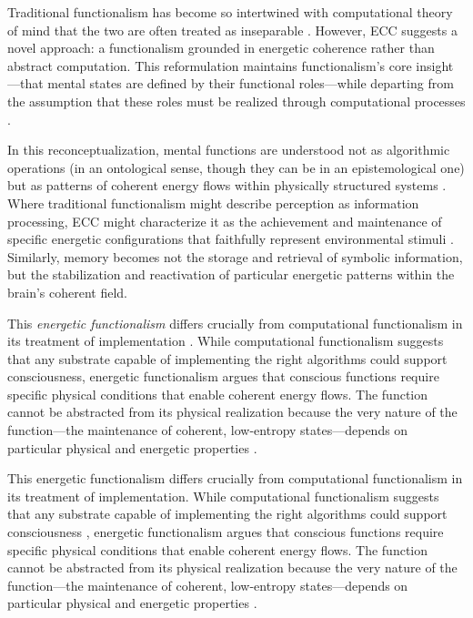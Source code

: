 \begin{refsection}
Traditional functionalism has become so intertwined with computational theory of mind that the two are often treated as inseparable \cite{piccinini2020neurocognitive}. However, ECC suggests a novel approach: a functionalism grounded in energetic coherence rather than abstract computation. This reformulation maintains functionalism's core insight—that mental states are defined by their functional roles—while departing from the assumption that these roles must be realized through computational processes \cite{van1995might}.

In this reconceptualization, mental functions are understood not as algorithmic operations (in an ontological sense, though they can be in an epistemological one) but as patterns of coherent energy flows within physically structured systems \cite{thompson2001radical}. Where traditional functionalism might describe perception as information processing, ECC might characterize it as the achievement and maintenance of specific energetic configurations that faithfully represent environmental stimuli \cite{gibson2014ecological}. Similarly, memory becomes not the storage and retrieval of symbolic information, but the stabilization and reactivation of particular energetic patterns within the brain's coherent field.

This \textit{energetic functionalism} differs crucially from computational functionalism in its treatment of implementation \cite{horst2011symbols}. While computational functionalism suggests that any substrate capable of implementing the right algorithms could support consciousness, energetic functionalism argues that conscious functions require specific physical conditions that enable coherent energy flows. The function cannot be abstracted from its physical realization because the very nature of the function—the maintenance of coherent, low-entropy states—depends on particular physical and energetic properties \cite{rosen1991life}.

This energetic functionalism differs crucially from computational functionalism in its treatment of implementation. While computational functionalism suggests that any substrate capable of implementing the right algorithms could support consciousness \cite{wheeler2010defense}, energetic functionalism argues that conscious functions require specific physical conditions that enable coherent energy flows. The function cannot be abstracted from its physical realization because the very nature of the function—the maintenance of coherent, low-entropy states—depends on particular physical and energetic properties \cite{nicholson2018everything,whitehead2010process}.


\end{refsection}
